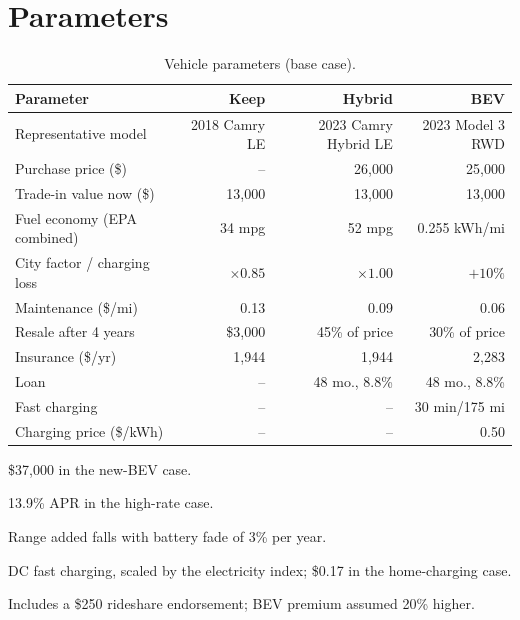 \documentclass[11pt]{article}
\begin{document}
\clearpage



\clearpage
\appendix

\section{Parameters}\label{app:params}

\begin{table}[H]
\centering
\caption{Vehicle parameters (base case).}\label{tab:params}
\small
\begin{threeparttable}
\begin{tabular}{@{}lrrr@{}}
\toprule
Parameter & Keep & Hybrid & BEV \\
\midrule
Representative model & 2018 Camry LE & 2023 Camry Hybrid LE & 2023 Model 3 RWD \\
Purchase price (\$) & -- & 26{,}000 & 25{,}000\tnote{a} \\
Trade-in value now (\$) & 13{,}000 & 13{,}000 & 13{,}000 \\
Fuel economy (EPA combined) & 34 mpg & 52 mpg & 0.255 kWh/mi \\
City factor / charging loss & $\times 0.85$ & $\times 1.00$ & $+10\%$ \\
Maintenance (\$/mi) & 0.13 & 0.09 & 0.06 \\
Resale after 4 years & \$3{,}000 & 45\% of price & 30\% of price \\
Insurance (\$/yr)\tnote{e} & 1{,}944 & 1{,}944 & 2{,}283 \\
Loan & -- & 48 mo., 8.8\%\tnote{b} & 48 mo., 8.8\%\tnote{b} \\
Fast charging & -- & -- & 30 min/175 mi\tnote{c} \\
Charging price (\$/kWh) & -- & -- & 0.50\tnote{d} \\
\bottomrule
\end{tabular}
\begin{tablenotes}\footnotesize
\item[a] \$37{,}000 in the new-BEV case. \item[b] 13.9\% APR in the high-rate case. \item[c] Range added falls with battery fade of 3\% per year. \item[d] DC fast charging, scaled by the electricity index; \$0.17 in the home-charging case. \item[e] Includes a \$250 rideshare endorsement; BEV premium assumed 20\% higher.
\end{tablenotes}
\end{threeparttable}
\end{table}
\end{document}
